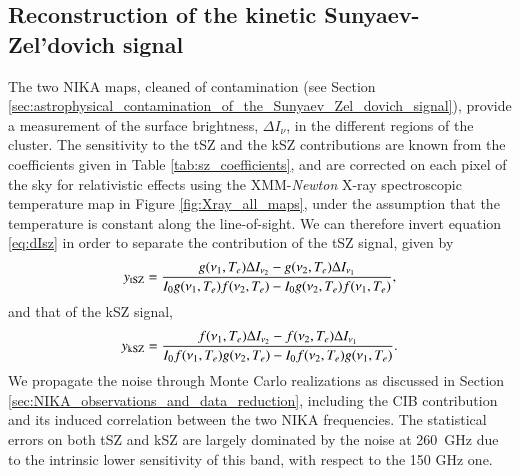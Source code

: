 \documentclass[twocolumn,traditabstract]{aa}
\begin{document}
\subsection{Reconstruction of the kinetic Sunyaev-Zel'dovich signal}\label{sec:Reconstruction_of_the_kinetic_Sunyaev_Zeldovich_signal}
The two NIKA maps, cleaned of contamination (see Section \ref{sec:astrophysical_contamination_of_the_Sunyaev_Zel_dovich_signal}), provide a measurement of the surface brightness, $\Delta I_{\nu}$, in the different regions of the cluster. The sensitivity to the tSZ and the kSZ contributions are known from the coefficients given in Table \ref{tab:sz_coefficients}, and are corrected on each pixel of the sky for relativistic effects using the XMM-\textit{Newton} X-ray spectroscopic temperature map in Figure  \ref{fig:Xray_all_maps}, under the assumption that the temperature is constant along the line-of-sight. We can therefore invert equation \ref{eq:dIsz} in order to separate the contribution of the tSZ signal, given by
\begin{equation}
	y_{\rm tSZ} = \frac{g(\nu_1, T_e) \Delta I_{\nu_2} - g(\nu_2, T_e) \Delta I_{\nu_1}}{I_0 g(\nu_1, T_e) f(\nu_2, T_e) - I_0 g(\nu_2, T_e) f(\nu_1, T_e)},
\label{eq:measurement_ytsz}
\end{equation}
and that of the kSZ signal,
\begin{equation}
	y_{\rm kSZ} = \frac{f(\nu_1, T_e) \Delta I_{\nu_2} - f(\nu_2, T_e) \Delta I_{\nu_1}}{I_0 f(\nu_1, T_e) g(\nu_2, T_e) - I_0 f(\nu_2, T_e) g(\nu_1, T_e)}.
\label{eq:measurement_yksz}
\end{equation}
We propagate the noise through Monte Carlo realizations as discussed in Section \ref{sec:NIKA_observations_and_data_reduction}, including the CIB contribution and its induced correlation between the two NIKA frequencies. The statistical errors on both tSZ and kSZ are largely dominated by the noise at 260~GHz due to the intrinsic lower sensitivity of this band, with respect to the 150 GHz one. 

\end{document}
